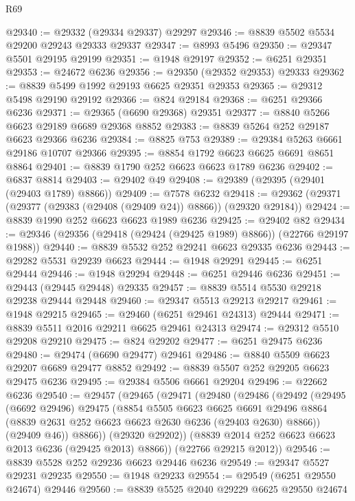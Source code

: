 \begin{lexlean}{R69}
\begin{coremodule}
{@29340 := @29332 (@29334 @29337) @29297
@29346 := @8839 @5502 @5534 @29200 @29243 @29333 @29337
@29347 := @8993 @5496
@29350 := @29347 @5501 @29195 @29199
@29351 := @1948 @29197
@29352 := @6251 @29351
@29353 := @24672 @6236
@29356 := @29350 (@29352 @29353) @29333
@29362 := @8839 @5499 @1992 @29193 @6625 @29351 @29353
@29365 := @29312 @5498 @29190 @29192
@29366 := @824 @29184
@29368 := @6251 @29366 @6236
@29371 := @29365 (@6690 @29368) @29351
@29377 := @8840 @5266 @6623 @29189 @6689 @29368 @8852
@29383 := @8839 @5264 @252 @29187 @6623 @29366 @6236
@29384 := @8825 @753
@29389 := @29384 @5263 @6661 @29186 @10707 @29366
@29395 := @8854 @1792 @6623 @6625 @6691 @8651 @8864
@29401 := @8839 @1790 @252 @6623 @6623 @1789 @6236
@29402 := @6837 @8814
@29403 := @29402 @49
@29408 := @29389 (@29395 (@29401 (@29403 @1789) @8866))
@29409 := @7578 @6232
@29418 := @29362 (@29371 (@29377 (@29383 (@29408 (@29409 @24)) @8866)) (@29320 @29184))
@29424 := @8839 @1990 @252 @6623 @6623 @1989 @6236
@29425 := @29402 @82
@29434 := @29346 (@29356 (@29418 (@29424 (@29425 @1989) @8866)) (@22766 @29197 @1988))
@29440 := @8839 @5532 @252 @29241 @6623 @29335 @6236
@29443 := @29282 @5531 @29239 @6623
@29444 := @1948 @29291
@29445 := @6251 @29444
@29446 := @1948 @29294
@29448 := @6251 @29446 @6236
@29451 := @29443 (@29445 @29448) @29335
@29457 := @8839 @5514 @5530 @29218 @29238 @29444 @29448
@29460 := @29347 @5513 @29213 @29217
@29461 := @1948 @29215
@29465 := @29460 (@6251 @29461 @24313) @29444
@29471 := @8839 @5511 @2016 @29211 @6625 @29461 @24313
@29474 := @29312 @5510 @29208 @29210
@29475 := @824 @29202
@29477 := @6251 @29475 @6236
@29480 := @29474 (@6690 @29477) @29461
@29486 := @8840 @5509 @6623 @29207 @6689 @29477 @8852
@29492 := @8839 @5507 @252 @29205 @6623 @29475 @6236
@29495 := @29384 @5506 @6661 @29204
@29496 := @22662 @6236
@29540 := @29457
    (@29465
      (@29471
        (@29480
          (@29486
            (@29492
              (@29495
                (@6692 @29496)
                @29475
                (@8854
                  @5505
                  @6623
                  @6625
                  @6691
                  @29496
                  @8864
                  (@8839 @2631 @252 @6623 @6623 @2630 @6236 (@29403 @2630) @8866))
                (@29409 @46))
              @8866))
          (@29320 @29202))
        (@8839 @2014 @252 @6623 @6623 @2013 @6236 (@29425 @2013) @8866))
      (@22766 @29215 @2012))
@29546 := @8839 @5528 @252 @29236 @6623 @29446 @6236
@29549 := @29347 @5527 @29231 @29235
@29550 := @1948 @29233
@29554 := @29549 (@6251 @29550 @24674) @29446
@29560 := @8839 @5525 @2040 @29229 @6625 @29550 @24674
}
\end{coremodule}
\end{lexlean}
